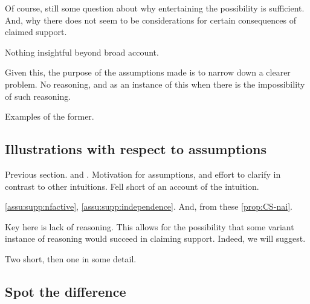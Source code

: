 \begin{note}
  Of course, still some question about why entertaining the possibility is sufficient.
  And, why there does not seem to be considerations for certain consequences of claimed support.

  Nothing insightful beyond broad account.

  Given this, the purpose of the assumptions made is to narrow down a clearer problem.
  No reasoning, and as an instance of this when there is the impossibility of such reasoning.

  Examples of the former.
\end{note}

\subsection{Illustrations with respect to assumptions}

\begin{note}
  Previous section.
  \ideaCSA{} and \ideaCSB{}.
  Motivation for assumptions, and effort to clarify in contrast to other intuitions.
  Fell short of an account of the intuition.

  \autoref{assu:supp:nfactive}, \autoref{assu:supp:independence}.
  And, from these \autoref{prop:CS-nai}.

  Key here is lack of reasoning.
  This allows for the possibility that some variant instance of reasoning would succeed in claiming support.
  Indeed, we will suggest.
\end{note}

\begin{note}
  Two short, then one in some detail.
\end{note}

\subsection{Spot the difference}


